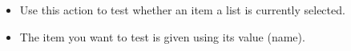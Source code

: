 \begin{itemize}
\item Use this action to test whether an item a list is currently selected. 
\item The item you want to test is given using its value (name).   
\end{itemize}
